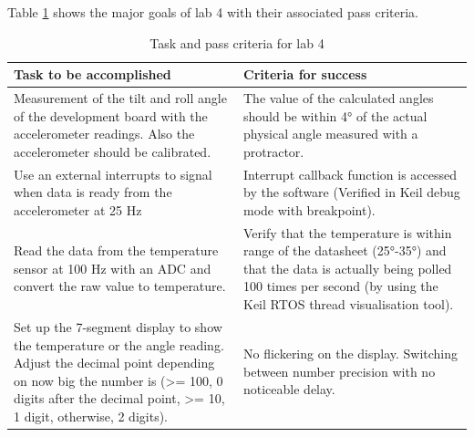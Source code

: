 \documentclass[12pt]{article}
\begin{document}
Table \ref{Table_tasks} shows the major goals of lab 4 with their associated pass criteria.
\begin{table}[!h]
\centering
\caption{Task and pass criteria for lab 4}
\label{Table_tasks}
\begin{tabular}{|p{0.5\linewidth}|p{0.5\linewidth}|}
\hline
\textbf{Task to be accomplished}                                                                                                                                                                                                              & \textbf{Criteria for success}                                                                                                                                                                                            \\ \hline
Measurement of the tilt and roll angle of the development board with the accelerometer readings. Also the accelerometer should be calibrated.                                                                                                 & The value of the calculated angles should be within 4° of the actual physical angle measured with a protractor.                                                                                                          \\ \hline
Use an external interrupts to signal when data is ready from the accelerometer at 25 Hz                                                                                                                                                       & Interrupt callback function is accessed by the software (Verified in Keil debug mode with breakpoint).                                                                                                                   \\ \hline
Read the data from the temperature sensor at 100 Hz with an ADC and convert the raw value to temperature.                                                                                                                                     & Verify that the temperature is within range of the datasheet (25°-35°) and that the data is actually being polled 100 times per second (by using the Keil RTOS thread visualisation tool).                               \\ \hline
Set up the 7-segment display to show the temperature or the angle reading. Adjust the decimal point depending on now big the number is (\textgreater= 100, 0 digits after the decimal point, \textgreater= 10, 1 digit, otherwise, 2 digits). & No flickering on the display. Switching between number precision with no noticeable delay.                                                                                                                               \\ \hline

\end{tabular}
\end{table}
\end{document}
